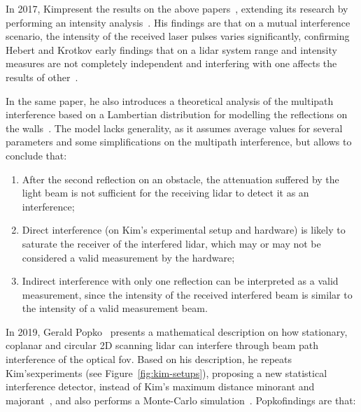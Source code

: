 

In 2017, Kim\etal present the results on the above papers~\cite{Kim2015a, Kim2015b, Kim2015c}, extending its research by performing an intensity analysis~\cite{Kim2017}. His findings are that on a mutual interference scenario, the intensity of the received \ac{laser} pulses varies significantly, confirming Hebert and Krotkov early findings that on a \ac{lidar} system range and intensity measures are not completely independent and interfering with one affects the results of other~\cite{Hebert}.

In the same paper, he also introduces a theoretical analysis of the multipath interference based on a Lambertian distribution for modelling the reflections on the walls~\cite{Kim2017}. The model lacks generality, as it assumes average values for several parameters and some simplifications on the multipath interference, but allows to conclude that:

\begin{enumerate}
	\item After the second reflection on an obstacle, the attenuation suffered by the light beam is not sufficient for the receiving \ac{lidar} to detect it as an interference;
	\item Direct interference (on Kim's experimental setup and hardware) is likely to saturate the receiver of the interfered \ac{lidar}, which may or may not be considered a valid measurement by the hardware;
	\item Indirect interference with only one reflection can be interpreted as a valid measurement, since the intensity of the received interfered beam is similar to the intensity of a valid measurement beam.
\end{enumerate}

In 2019, Gerald Popko\etal~\cite{Popko2019a} presents a mathematical description on how stationary, coplanar and circular 2D scanning \ac{lidar} can interfere through beam path interference of the optical \ac{fov}. Based on his description, he repeats Kim's\etal experiments (see Figure~\ref{fig:kim-setups}), proposing a new statistical interference detector, instead of Kim's maximum distance minorant and majorant~\cite{Kim2015a}, and also performs a Monte-Carlo simulation~\cite{Popko2019b}. Popko\etal findings are that:

